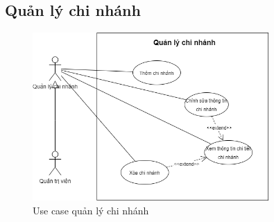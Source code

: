     \subsection{Quản lý chi nhánh}
        \begin{figure}[!htp]
            \centering
            \includegraphics[width=9cm]{img/UseCase/UseCase-Quản lý chi nhánh.drawio.png}
            \newline
         \caption{Use case quản lý chi nhánh}
        \end{figure}
